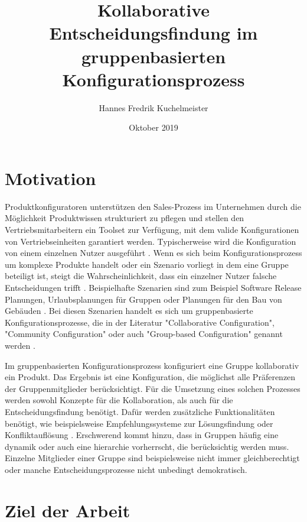 \documentclass{article}
\title{Kollaborative Entscheidungsfindung im gruppenbasierten Konfigurationsprozess}
\author{Hannes Fredrik Kuchelmeister}
\date{Oktober 2019}
\begin{document}
\maketitle

\section{Motivation}

Produktkonfiguratoren unterstützen den Sales-Prozess im Unternehmen durch die Möglichkeit Produktwissen strukturiert zu pflegen und stellen den Vertriebsmitarbeitern ein Toolset zur Verfügung, mit dem valide Konfigurationen von Vertriebseinheiten garantiert werden. Typischerweise wird die Konfiguration von einem einzelnen Nutzer ausgeführt \cite{felferningGroupBasedConfiguration2016, velasquez-guevaraMultiSPLOTSupportingMultiuser2018a}.
Wenn es sich beim Konfigurationsprozess um komplexe Produkte handelt oder ein Szenario vorliegt in dem eine Gruppe beteiligt ist, steigt die Wahrscheinlichkeit, dass ein einzelner Nutzer falsche Entscheidungen trifft \cite{felfernigGroupDecisionSupport2011}. 
Beispielhafte Szenarien sind zum Beispiel Software Release Planungen, Urlaubsplanungen für Gruppen oder Planungen für den Bau von Gebäuden \cite{felfernigOpenConfiguration2014}. 
Bei diesen Szenarien handelt es sich um gruppenbasierte Konfigurationsprozesse, die in der Literatur "Collaborative Configuration", "Community Configuration" oder auch "Group-based Configuration" genannt werden \cite{felferningGroupBasedConfiguration2016, felfernigOpenConfiguration2014,mendoncaCollaborativeProductConfiguration2008,felfernigKnowledgebasedConfigurationResearch2014}.

Im gruppenbasierten Konfigurationsprozess konfiguriert eine Gruppe kollaborativ ein Produkt. Das Ergebnis ist eine Konfiguration, die möglichst alle Präferenzen der Gruppenmitglieder berücksichtigt. Für die Umsetzung eines solchen Prozesses werden sowohl Konzepte für die Kollaboration, als auch für die Entscheidungsfindung benötigt. Dafür werden zusätzliche Funktionalitäten benötigt, wie beispielsweise Empfehlungssysteme zur Lösungsfindung oder Konfliktauflösung \cite{felfernigKnowledgebasedConfigurationResearch2014}. 
Erschwerend kommt hinzu, dass in Gruppen häufig eine dynamik oder auch eine hierarchie vorherrscht, die berücksichtig werden muss. Einzelne Mitglieder einer Gruppe sind beispielsweise nicht immer gleichberechtigt oder manche Entscheidungsprozesse nicht unbedingt demokratisch.

\section{Ziel der Arbeit}
\end{document}
